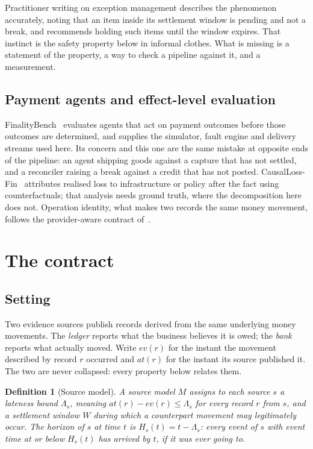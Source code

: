 \documentclass[10pt,conference]{IEEEtran}
\newtheorem{definition}{Definition}
\begin{document}
Practitioner writing on exception management describes the phenomenon accurately, noting that an item inside its settlement
window is pending and not a break, and recommends holding such items until the
window expires. That instinct is
the safety property below in informal clothes. What is missing is a statement of
the property, a way to check a pipeline against it, and a measurement.

\subsection{Payment agents and effect-level evaluation}

FinalityBench~\cite{finalitybench} evaluates agents that act on payment
outcomes before those outcomes are determined, and supplies the simulator,
fault engine and delivery streams used here. Its concern and this one are the
same mistake at opposite ends of the pipeline: an agent shipping goods against
a capture that has not settled, and a reconciler raising a break against a
credit that has not posted. CausalLoss-Fin~\cite{causalloss} attributes
realised loss to infrastructure or policy after the fact using counterfactuals;
that analysis needs ground truth, where the decomposition here does not.
Operation identity, what makes two records the same money movement, follows
the provider-aware contract of~\cite{t8}.

\section{The contract}

\subsection{Setting}

Two evidence sources publish records derived from the same underlying money
movements. The \emph{ledger} reports what the business believes it is owed; the
\emph{bank} reports what actually moved. Write $\mathit{ev}(r)$ for the instant
the movement described by record $r$ occurred and $\mathit{at}(r)$ for the
instant its source published it. The two are never collapsed: every property
below relates them.

\begin{definition}[Source model]
A source model $M$ assigns to each source $s$ a lateness bound $\Lambda_s$,
meaning $\mathit{at}(r) - \mathit{ev}(r) \le \Lambda_s$ for every record $r$
from $s$, and a settlement window $W$ during which a counterpart movement may
legitimately occur. The \emph{horizon} of $s$ at time $t$ is
$H_s(t) = t - \Lambda_s$: every event of $s$ with event time at or below
$H_s(t)$ has arrived by $t$, if it was ever going to.
\end{definition}
\end{document}
